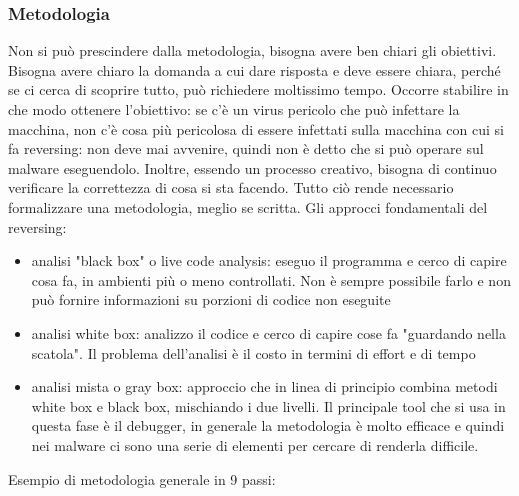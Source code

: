 \documentclass{article}
\begin{document}
\subsubsection{Metodologia}
Non si può prescindere dalla metodologia, bisogna avere ben chiari gli obiettivi. Bisogna avere chiaro la domanda a cui dare risposta e deve essere chiara, perché se ci cerca di scoprire tutto, può richiedere moltissimo tempo. Occorre stabilire in che modo ottenere l'obiettivo: se c'è un virus pericolo che può infettare la macchina, non c'è cosa più pericolosa di essere infettati sulla macchina con cui si fa reversing: non deve mai avvenire, quindi non è detto che si può operare sul malware eseguendolo. Inoltre, essendo un processo creativo, bisogna di continuo verificare la correttezza di cosa si sta facendo. Tutto ciò rende necessario formalizzare una metodologia, meglio se scritta. Gli approcci fondamentali del reversing:
\begin{itemize}
\item analisi "black box" o live code analysis: eseguo il programma e cerco di capire cosa fa, in ambienti più o meno controllati. Non è sempre possibile farlo e non può fornire informazioni su porzioni di codice non eseguite
\item analisi white box: analizzo il codice e cerco di capire cose fa "guardando nella scatola". Il problema dell'analisi è il costo in termini di effort e di tempo
\item analisi mista o gray box: approccio che in linea di principio combina metodi white box e black box, mischiando i due livelli. Il principale tool che si usa in questa fase è il debugger, in generale la metodologia è molto efficace e quindi nei malware ci sono una serie di elementi per cercare di renderla difficile.
\end{itemize}
Esempio di metodologia generale in 9 passi:
\end{document}
